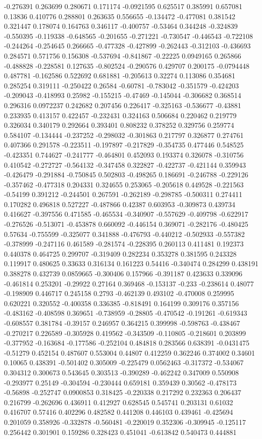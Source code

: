 -0.276391 0.263699 0.280671 0.171174 -0.0921595 0.625517 0.385991 0.657081 0.13836 0.410776 0.288801 0.263635 0.556655 -0.134472 -0.477081 0.381542 0.321447 0.178074 0.164763 0.346117 -0.400757 -0.53464 0.344248 -0.324839 -0.550395 -0.119338 -0.648565 -0.201655 -0.271221 -0.730547 -0.446543 -0.722108 -0.244264 -0.254645 0.266665 -0.477328 -0.427899 -0.262443 -0.312103 -0.436693 0.284571 0.571756 0.156308 -0.537694 -0.841867 -0.22225 0.0949165 0.265866 -0.488828 -0.228581 0.127635 -0.802524 -0.290576 0.429707 0.200175 -0.0794448 0.487781 -0.162586 0.522692 0.681881 -0.205613 0.32274 0.113086 0.354681 0.285254 0.319111 -0.250422 0.26584 -0.60781 -0.783042 -0.351579 -0.424203 -0.209043 -0.418993 0.25982 -0.155215 -0.47469 -0.145044 -0.306682 0.368514 0.296316 0.0972237 0.242682 0.207456 0.226417 -0.325163 -0.536677 -0.43881 0.233935 0.413157 0.422457 -0.232431 0.324163 0.506684 0.220462 0.219779 0.326034 0.340179 0.292664 0.393401 0.808232 0.378252 0.329756 0.259774 0.584107 -0.134444 -0.237252 -0.298032 -0.301863 0.217797 0.326877 0.274761 0.407366 0.291578 -0.223511 -0.197897 -0.217829 -0.354735 0.477446 0.548525 -0.423351 0.744627 -0.241777 -0.464801 0.452093 0.193374 0.326078 -0.310756 0.410542 -0.272727 -0.564132 -0.347458 0.322827 -0.422737 -0.421144 0.359943 -0.426479 -0.291884 -0.750845 0.502803 -0.498265 0.186691 -0.246788 -0.229126 -0.357462 -0.477318 0.204331 0.324655 0.253065 -0.205618 0.449528 -0.221563 -0.54199 0.391212 -0.244501 0.267591 -0.262189 -0.298785 -0.500311 0.274411 0.170282 0.496818 0.527227 -0.487866 0.42387 0.603953 -0.309873 0.439734 0.416627 -0.397556 0.471585 -0.465534 -0.340907 -0.557629 -0.409798 -0.622917 -0.276526 -0.513071 -0.453878 0.660092 -0.446154 0.369071 -0.282176 -0.480425 0.57634 -0.755599 -0.325077 0.341888 -0.476793 -0.440212 -0.502933 -0.557382 -0.378999 -0.247116 0.461589 -0.281574 -0.228395 0.260113 0.411481 0.192373 0.440378 0.464725 0.299707 -0.319409 0.282234 0.353278 0.381595 0.243328 0.119917 0.480625 0.33633 0.316134 0.161223 0.54416 -0.340474 0.284299 0.438191 0.388278 0.432739 0.0859665 -0.300406 0.157966 -0.391187 0.423633 0.339096 -0.461814 0.253201 -0.29922 0.27164 0.369468 -0.153137 -0.233 -0.238614 0.48077 -0.198909 0.446717 0.245158 0.2793 -0.462139 0.493102 -0.470008 0.259995 0.620221 0.320552 -0.400358 0.336385 -0.818491 0.164199 0.309176 0.357156 -0.483162 -0.408598 0.369651 -0.738959 -0.28805 -0.470542 -0.191261 -0.619343 -0.608557 0.381784 -0.39157 0.246957 0.364215 0.399998 -0.598763 -0.438467 -0.270217 0.226589 -0.305928 0.419562 -0.343509 -0.110805 -0.218601 0.203899 -0.377952 -0.163684 -0.177586 -0.252104 0.484818 0.283566 0.638391 -0.0431475 -0.51279 0.452154 0.487607 0.553004 0.44807 0.412259 0.362246 0.374002 0.34601 0.10065 0.438391 -0.501402 0.305009 -0.225479 0.0562463 -0.317372 -0.534067 0.304312 0.300673 0.543645 0.303513 -0.390289 -0.462242 0.347009 0.550908 -0.293977 0.25149 -0.304594 -0.230444 0.659181 0.359439 0.30562 -0.478173 -0.56898 -0.252747 0.0900853 0.318425 -0.220338 0.217292 0.232363 0.206437 0.216799 -0.262696 0.436911 0.412927 0.628545 0.545741 0.203131 0.61032 0.416707 0.57416 0.402296 0.482582 0.441208 0.446103 0.439461 -0.425694 0.201059 0.358926 -0.332878 -0.560481 -0.220019 0.352306 -0.309945 -0.125117 0.256442 0.301901 0.159286 0.328423 0.451041 -0.613842 0.540473 0.444881 